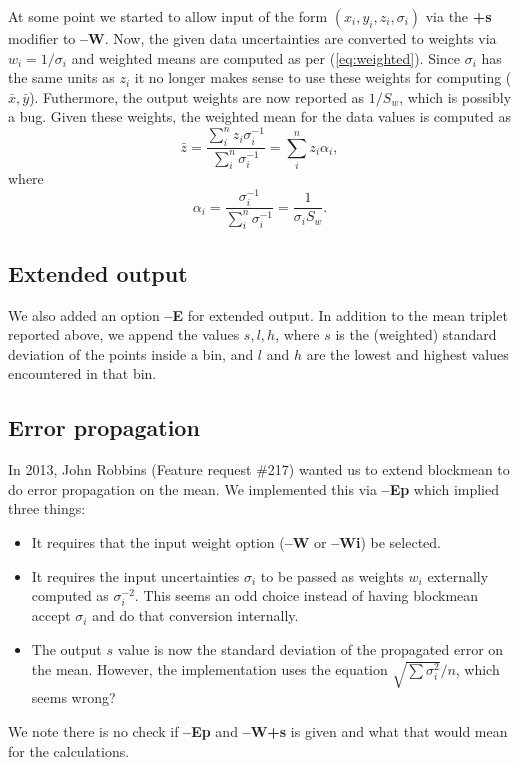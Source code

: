 \documentclass[12pt,letterpaper,margin=0.5in]{report}
\begin{document}
At some point we started to allow input of the form  $(x_i,y_i,z_i,\sigma_i)$ via the {\bf +s} modifier to {\bf--W}. Now,
the given data uncertainties are converted to weights via $w_i = 1/\sigma_i$ and weighted means are computed
as per (\ref{eq:weighted}).  Since $\sigma_i$ has the same units as $z_i$ it no longer makes sense to use these weights
for computing ($\bar{x}, \bar{y}$).  Futhermore, the output weights are now reported as $1/S_w$, which is possibly a bug.
Given these weights, the weighted mean for the data values is computed as
\begin{equation}
	\bar{z} = \frac{\sum_i^n z_i \sigma_i^{-1}}{\sum_i^n \sigma_i^{-1}} = \sum_i^n z_i \alpha_i,
	\label{eq:w}
\end{equation}
where
\begin{equation}
	\alpha_i = \frac{ \sigma_i^{-1}}{\sum_i^n \sigma_i^{-1}} = \frac{1}{\sigma_i S_w}.
	\label{eq:a}
\end{equation}


\subsection*{Extended output}

We also added an option {\bf --E} for extended output.  In addition to the mean triplet reported above, we append
the values $s, l, h$, where $s$ is the (weighted) standard deviation of the points inside a bin, and $l$ and
$h$ are the lowest and highest values encountered in that bin.

\subsection*{Error propagation}

In 2013, John Robbins (Feature request \#217) wanted us to extend blockmean to do error propagation on the mean.  We implemented
this via {\bf --Ep} which implied three things:
\begin{itemize}
	\item It requires that the input weight option ({\bf --W} or {\bf --Wi}) be selected.
	\item It requires the input uncertainties $\sigma_i$ to be passed as weights $w_i$ externally computed as $\sigma_i^{-2}$.
		This seems an odd choice instead of having blockmean accept $\sigma_i$ and do that conversion internally.
	\item The output $s$ value is now the standard deviation of the propagated error on the mean.  However, the
		implementation uses the equation $\sqrt{\sum \sigma_i^2}/n$, which seems wrong?
\end{itemize}
We note there is no check if {\bf --Ep} and {\bf --W+s} is given and what that would mean for the calculations.
\end{document}
